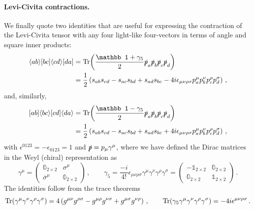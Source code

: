 \paragraph{Levi-Civita contractions.}

We finally quote two identities \cite{Dixon:1996wi} that are useful for expressing the contraction of the Levi-Civita tensor with any four light-like four-vectors in terms of angle and square inner products:
\begin{align}
        \agl{a}{b}\sqr{b}{c}\agl{c}{d}\sqr{d}{a} &= \Tr( \frac{\mathbb 1 + \gamma_5}{2}\sls p_a \sls p_b \sls p_c \sls p_d)\nonumber \\ 
        &= \frac{1}{2}\left(s_{ab}s_{cd}-s_{ac}s_{bd}+s_{ad}s_{bc}-4i\epsilon_{\mu\nu\rho\sigma}p_a^\mu p_b^\nu p_c^\rho p_d^\sigma \right)\,,\label{eq:lc_identity}
\end{align}
and, similarly,
\begin{align}
        \sqr{a}{b}\agl{b}{c}\sqr{c}{d}\agl{d}{a} &= \Tr( \frac{\mathbb 1 - \gamma_5}{2}\sls p_a \sls p_b \sls p_c \sls p_d)\nonumber \\ 
        &= \frac{1}{2}\left(s_{ab}s_{cd}-s_{ac}s_{bd}+s_{ad}s_{bc}+4i\epsilon_{\mu\nu\rho\sigma}p_a^\mu p_b^\nu p_c^\rho p_d^\sigma \right)\,,
\end{align}
with $\epsilon^{0123} = -\epsilon_{0123} = 1$ and $\slashed{p} = p_\mu \gamma^\mu$, where we have defined the Dirac matrices in the Weyl (chiral) representation as
\begin{equation}
    \gamma^\mu = \begin{pmatrix}
        \mathbb 0_{2\times 2} & \sigma^\mu\\
        \overline \sigma^{\mu} & \mathbb 0_{2\times 2}
    \end{pmatrix}\,,\qquad
    \gamma_5 = \frac{-i}{4!}\epsilon_{\mu\nu\rho\sigma}\gamma^\mu\gamma^\nu\gamma^\rho\gamma^\sigma = \begin{pmatrix}
        -\mathbb{1}_{2\times 2} & \mathbb 0_{2\times 2}\\
        \mathbb 0_{2\times 2} & \mathbb{1}_{2\times 2}
    \end{pmatrix}\,.
    \label{eq:weylgamma}
\end{equation}
The identities follow from the trace theorems
\begin{equation}
    \Tr(\gamma^\mu\gamma^\nu\gamma^\rho\gamma^\sigma)
    = 4\left(g^{\mu\nu}g^{\rho\sigma}-g^{\mu\rho}g^{\nu\sigma}+g^{\mu\sigma}g^{\nu\rho}\right)\,,
    \qquad
    \Tr(\gamma_5 \gamma^\mu\gamma^\nu\gamma^\rho\gamma^\sigma) = - 4i\epsilon^{\mu\nu\rho\sigma} \,.
\end{equation}

